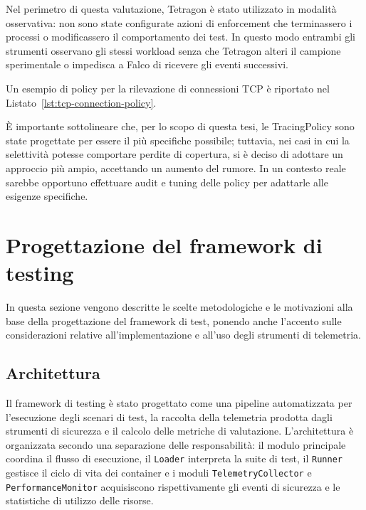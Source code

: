 \documentclass[12pt,a4paper,openright,twoside]{book}
\begin{document}
Nel perimetro di questa valutazione, Tetragon è stato utilizzato in modalità osservativa: non sono state configurate azioni di enforcement che terminassero i processi o modificassero il comportamento dei test. In questo modo entrambi gli strumenti osservano gli stessi workload senza che Tetragon alteri il campione sperimentale o impedisca a Falco di ricevere gli eventi successivi.

Un esempio di policy per la rilevazione di connessioni TCP è riportato nel Listato~\ref{lst:tcp-connection-policy}. 



È importante sottolineare che, per lo scopo di questa tesi, le TracingPolicy sono state progettate per essere il più specifiche possibile; tuttavia, nei casi in cui la selettività potesse comportare perdite di copertura, si è deciso di adottare un approccio più ampio, accettando un aumento del rumore. In un contesto reale sarebbe opportuno effettuare audit e tuning delle policy per adattarle alle esigenze specifiche.

\section{Progettazione del framework di testing}
\label{sec:testing-program-design}

In questa sezione vengono descritte le scelte metodologiche e le motivazioni alla base della progettazione del framework di test, ponendo anche l'accento sulle considerazioni relative all'implementazione e all'uso degli strumenti di telemetria.

\subsection{Architettura}
Il framework di testing è stato progettato come una pipeline automatizzata per l'esecuzione degli scenari di test, la raccolta della telemetria prodotta dagli strumenti di sicurezza e il calcolo delle metriche di valutazione. L'architettura è organizzata secondo una separazione delle responsabilità: il modulo principale coordina il flusso di esecuzione, il \texttt{Loader} interpreta la suite di test, il \texttt{Runner} gestisce il ciclo di vita dei container e i moduli \texttt{TelemetryCollector} e \texttt{PerformanceMonitor} acquisiscono rispettivamente gli eventi di sicurezza e le statistiche di utilizzo delle risorse.
\end{document}
